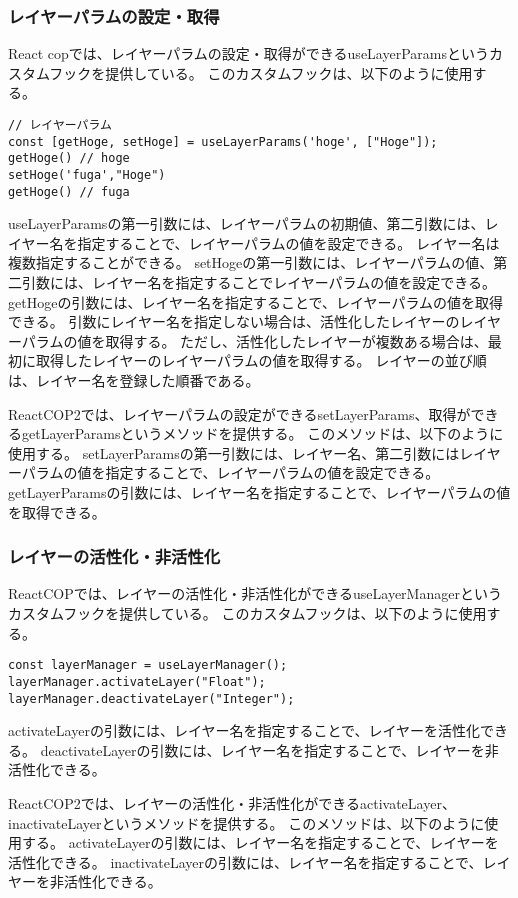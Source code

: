 \documentclass{jsarticle}
\begin{document}
\subsubsection{レイヤーパラムの設定・取得}
React copでは、レイヤーパラムの設定・取得ができるuseLayerParamsというカスタムフックを提供している。
このカスタムフックは、以下のように使用する。
\begin{lstlisting}[]
// レイヤーパラム
const [getHoge, setHoge] = useLayerParams('hoge', ["Hoge"]);
getHoge() // hoge
setHoge('fuga',"Hoge")
getHoge() // fuga

\end{lstlisting}
useLayerParamsの第一引数には、レイヤーパラムの初期値、第二引数には、レイヤー名を指定することで、レイヤーパラムの値を設定できる。
レイヤー名は複数指定することができる。
setHogeの第一引数には、レイヤーパラムの値、第二引数には、レイヤー名を指定することでレイヤーパラムの値を設定できる。
getHogeの引数には、レイヤー名を指定することで、レイヤーパラムの値を取得できる。
引数にレイヤー名を指定しない場合は、活性化したレイヤーのレイヤーパラムの値を取得する。
ただし、活性化したレイヤーが複数ある場合は、最初に取得したレイヤーのレイヤーパラムの値を取得する。
レイヤーの並び順は、レイヤー名を登録した順番である。

ReactCOP2では、レイヤーパラムの設定ができるsetLayerParams、取得ができるgetLayerParamsというメソッドを提供する。
このメソッドは、以下のように使用する。
setLayerParamsの第一引数には、レイヤー名、第二引数にはレイヤーパラムの値を指定することで、レイヤーパラムの値を設定できる。
getLayerParamsの引数には、レイヤー名を指定することで、レイヤーパラムの値を取得できる。

\subsubsection{レイヤーの活性化・非活性化}
ReactCOPでは、レイヤーの活性化・非活性化ができるuseLayerManagerというカスタムフックを提供している。
このカスタムフックは、以下のように使用する。
\begin{lstlisting}[]
const layerManager = useLayerManager();
layerManager.activateLayer("Float");
layerManager.deactivateLayer("Integer");
\end{lstlisting}
activateLayerの引数には、レイヤー名を指定することで、レイヤーを活性化できる。
deactivateLayerの引数には、レイヤー名を指定することで、レイヤーを非活性化できる。

ReactCOP2では、レイヤーの活性化・非活性化ができるactivateLayer、inactivateLayerというメソッドを提供する。
このメソッドは、以下のように使用する。
activateLayerの引数には、レイヤー名を指定することで、レイヤーを活性化できる。
inactivateLayerの引数には、レイヤー名を指定することで、レイヤーを非活性化できる。
\end{document}
